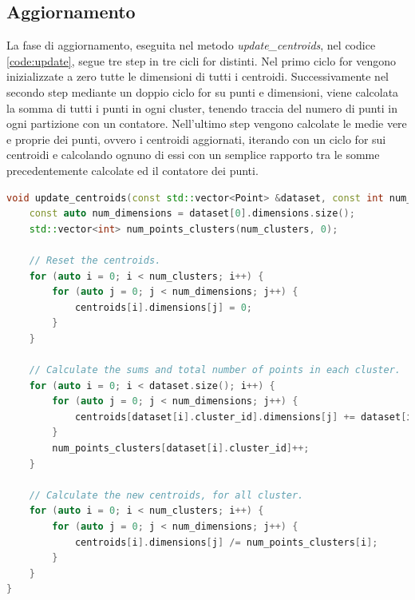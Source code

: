 \documentclass[10pt,twocolumn,letterpaper]{article}
\begin{document}
\subsection{Aggiornamento}
La fase di aggiornamento, eseguita nel metodo \textit{update\_centroids}, nel codice \ref{code:update}, segue tre step in tre cicli for distinti. Nel primo ciclo for vengono inizializzate a zero tutte le dimensioni di tutti i centroidi. Successivamente nel secondo step mediante un doppio ciclo for su punti e dimensioni, viene calcolata la somma di tutti i punti in ogni cluster, tenendo traccia del numero di punti in ogni partizione con un contatore. Nell'ultimo step vengono calcolate le medie vere e proprie dei punti, ovvero i centroidi aggiornati, iterando con un ciclo for sui centroidi e calcolando ognuno di essi con un semplice rapporto tra le somme precedentemente calcolate ed il contatore dei punti.
\begin{lstlisting}[language=c++, caption=Aggiornamento sequenziale, label=code:update]
void update_centroids(const std::vector<Point> &dataset, const int num_clusters, std::vector<Point> &centroids) {
	const auto num_dimensions = dataset[0].dimensions.size();
	std::vector<int> num_points_clusters(num_clusters, 0);

	// Reset the centroids.
	for (auto i = 0; i < num_clusters; i++) {
		for (auto j = 0; j < num_dimensions; j++) {
			centroids[i].dimensions[j] = 0;
		}
	}
	
	// Calculate the sums and total number of points in each cluster.
	for (auto i = 0; i < dataset.size(); i++) {
		for (auto j = 0; j < num_dimensions; j++) {
			centroids[dataset[i].cluster_id].dimensions[j] += dataset[i].dimensions[j];
		}
		num_points_clusters[dataset[i].cluster_id]++;
	}
	
	// Calculate the new centroids, for all cluster.
	for (auto i = 0; i < num_clusters; i++) {
		for (auto j = 0; j < num_dimensions; j++) {
			centroids[i].dimensions[j] /= num_points_clusters[i];
		}
	}
}
\end{lstlisting}
\end{document}
